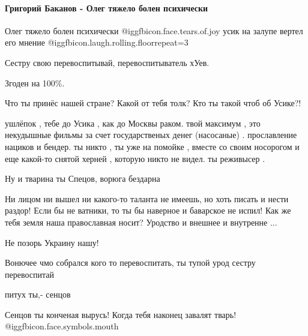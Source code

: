  
 
 
 
 
\paragraph{Григорий Баканов - Олег тяжело болен психически}
\label{sec:27_09_2021.fb.sentsov_oleg.1.usik.cmt.4.bakanov_oleg_psihika}

\begin{itemize} %

Олег тяжело болен психически  @igg{fbicon.face.tears.of.joy}  усик на залупе
вертел его мнение  @igg{fbicon.laugh.rolling.floor}{repeat=3} 

Сестру свою перевоспитывай, перевоспитыватель хУев.

Згоден на 100\%.

Что ты принёс нашей стране? Какой от тебя толк? Кто ты такой чтоб об Усике?!


ушлёпок , тебе до Усика , как до Москвы раком. твой максимум , это некудышные
фильмы за счет государственых денег (насосаные) . прославление нациков и
бендер. ты никто , ты уже на помойке , вместе со своим носорогом и еще какой-то
снятой херней , которую никто не видел. ты реживысер .

Ну и тварина ты Спецов, ворюга бездарна


Ни лицом ни вышел ни какого-то таланта не имеешь, но хоть писать и нести
раздор! Если бы не ватники, то ты бы наверное и баварское не испил! Как же тебя
земля наша православная носит? Уродство и внешнее и внутренне ...

Не позорь Украину нашу!


Вонючее чмо собрался кого то перевоспитать, ты тупой урод сестру перевоспитай

питух ты,- сенцов

Сенцов ты конченая вырусь! Когда тебя наконец завалят тварь! @igg{fbicon.face.symbols.mouth} 


\end{itemize}
